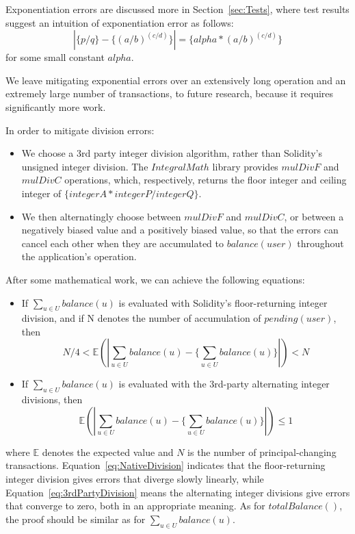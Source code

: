 \documentclass{article}
\begin{document}
Exponentiation errors are discussed more in Section~\ref{sec:Tests}, where 
test results suggest an intuition of exponentiation error as follows:
\begin{equation} \label{eq:ExponentiationError_intuision}
  | \{p / q\} - \{(a / b) ^ {(c / d)}\} | = \{alpha * (a / b) ^ {(c / d)}\}
\end{equation}
for some small constant $alpha$. 

We leave mitigating exponential errors 
over an extensively long operation and an extremely large number of transactions, 
to future research, because it requires significantly more work.

In order to mitigate division errors:

\begin{itemize}
  \item We choose a 3rd party integer division algorithm, 
  rather than Solidity's unsigned integer division. The $IntegralMath$ library 
  provides $mulDivF$ and $mulDivC$ operations, which, respectively, returns 
  the floor integer and ceiling integer of $\{integerA * integerP / integerQ\}$.
  \item We then alternatingly choose between $mulDivF$ and $mulDivC$, or between 
  a negatively biased value and a positively biased value, 
  so that the errors can cancel each other when they are accumulated 
  to $balance(user)$ throughout the application's operation.
\end{itemize}

After some mathematical work, we can achieve the following equations:

\begin{itemize}
  \item If $\sum_{u \in U} balance(u)$ is evaluated with Solidity's floor-returning integer division, 
  and if N denotes the number of accumulation of $pending(user)$, then
    \begin{equation} \label{eq:NativeDivision}
    N/4 < \mathbb{E} (| \sum_{u \in U} balance(u) - \{ {\sum_{u \in U} balance(u)} \} |) < N
    \end{equation}
    \item If $\sum_{u \in U} balance(u)$ is evaluated with the 3rd-party alternating integer divisions, then
    \begin{equation} \label{eq:3rdPartyDivision}
      \mathbb{E} (| \sum_{u \in U} balance(u) - \{ {\sum_{u \in U} balance(u)} \} |) \le 1
    \end{equation}
\end{itemize}
where $\mathbb{E}$ denotes the expected value and $N$ is the number of principal-changing transactions.
Equation~\ref{eq:NativeDivision} indicates that the floor-returning integer division gives errors 
that diverge slowly linearly, while Equation~\ref{eq:3rdPartyDivision} means the alternating 
integer divisions give errors that converge to zero, both in an appropriate meaning.
As for $totalBalance()$, the proof should be similar as for $\sum_{u \in U} balance(u)$.
\end{document}

